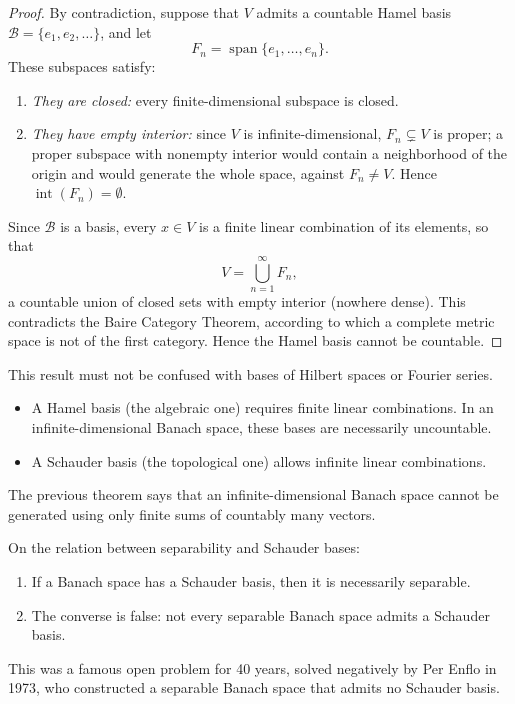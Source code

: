 \documentclass[11pt, a4paper]{article}
\begin{document}
\begin{proof}
By contradiction, suppose that $V$ admits a countable Hamel basis $\mathcal{B} = \{e_1, e_2, \dots\}$, and let
\[
F_n = \operatorname{span}\{e_1, \dots, e_n\}.
\]
These subspaces satisfy:
\begin{enumerate}
    \item \textit{They are closed:} every finite-dimensional subspace is closed.
    \item \textit{They have empty interior:} since $V$ is infinite-dimensional, $F_n \subsetneq V$ is proper; a proper subspace with nonempty interior would contain a neighborhood of the origin and would generate the whole space, against $F_n \neq V$. Hence $\operatorname{int}(F_n) = \emptyset$.
\end{enumerate}
Since $\mathcal{B}$ is a basis, every $x \in V$ is a finite linear combination of its elements, so that
\[
V = \bigcup_{n=1}^{\infty} F_n,
\]
a countable union of closed sets with empty interior (nowhere dense). This contradicts the Baire Category Theorem, according to which a complete metric space is not of the first category. Hence the Hamel basis cannot be countable.
\end{proof}

\obs This result must not be confused with bases of Hilbert spaces or Fourier series.
\begin{itemize}
    \item A Hamel basis (the algebraic one) requires finite linear combinations. In an infinite-dimensional Banach space, these bases are necessarily uncountable.
    \item A Schauder basis (the topological one) allows infinite linear combinations.
\end{itemize}
The previous theorem says that an infinite-dimensional Banach space cannot be generated using only finite sums of countably many vectors.

\obs On the relation between separability and Schauder bases:
\begin{enumerate}
    \item If a Banach space has a Schauder basis, then it is necessarily separable.
    \item The converse is false: not every separable Banach space admits a Schauder basis.
\end{enumerate}
This was a famous open problem for 40 years, solved negatively by Per Enflo in 1973, who constructed a separable Banach space that admits no Schauder basis.
\end{document}
